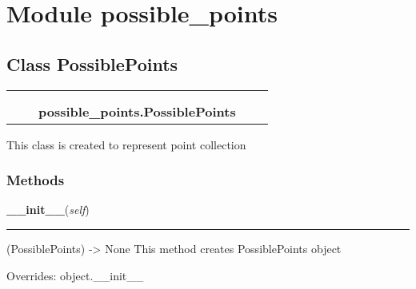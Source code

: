 %
%
%


\section{Module possible\_points}

    \label{possible_points}


\subsection{Class PossiblePoints}

    \label{possible_points:PossiblePoints}
\begin{tabular}{cccccc}
\multicolumn{2}{r}{\settowidth{\BCL}{object}\multirow{2}{\BCL}{object}}
&&
  \\\cline{3-3}
  &&\multicolumn{1}{c|}{}
&&
  \\
&&\multicolumn{2}{l}{\textbf{possible\_points.PossiblePoints}}
\end{tabular}

This class is created to represent point collection



  \subsubsection{Methods}

    \vspace{0.5ex}

\hspace{.8\funcindent}\begin{boxedminipage}{\funcwidth}

    \raggedright \textbf{\_\_init\_\_}(\textit{self})

    \vspace{-1.5ex}

    \rule{\textwidth}{0.5\fboxrule}
\setlength{\parskip}{2ex}
    (PossiblePoints) -{\textgreater} None This method creates 
    PossiblePoints object

\setlength{\parskip}{1ex}
      Overrides: object.\_\_init\_\_

    \end{boxedminipage}

